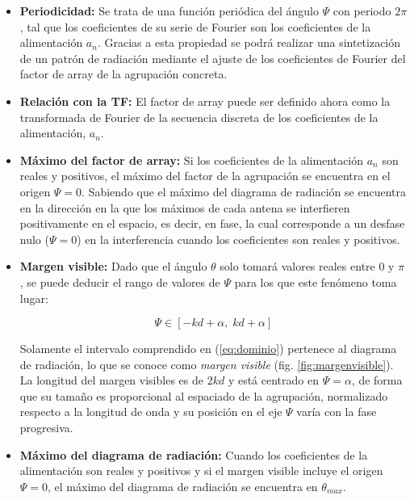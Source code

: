 \begin{itemize}
\item \textbf{Periodicidad: }Se trata de una función periódica del ángulo $\Psi$ con periodo $2\pi$, tal que los coeficientes de su serie de Fourier son los coeficientes de la alimentación $a_{n}$. Gracias a esta propiedad se podrá realizar una sintetización de un patrón de radiación mediante el ajuste de los coeficientes de Fourier del factor de array de la agrupación concreta.

\item \textbf{Relación con la TF: }El factor de array puede ser definido ahora como la transformada de Fourier de la secuencia discreta de los coeficientes de la alimentación, $a_{n}$.

\item \textbf{Máximo del factor de array: }Si los coeficientes de la alimentación $a_{n}$ son reales y positivos, el máximo del factor de la agrupación se encuentra en el origen $\Psi=0$. Sabiendo que el máximo del diagrama de radiación se encuentra en la dirección en la que los máximos de cada antena se interfieren positivamente en el espacio, es decir, en fase, la cual corresponde a un desfase nulo ($\Psi=0$) en la interferencia cuando los coeficientes son reales y positivos.

\item \textbf{Margen visible: }Dado que el ángulo $\theta$ solo tomará valores reales entre 0 y $\pi$, se puede deducir el rango de valores de $\Psi$ para los que este fenómeno toma lugar:

\begin{equation}
	\Psi \in \left [ -kd+\alpha ,\; kd+\alpha \right ]
	\label{eq:dominio}
\end{equation}

\par Solamente el intervalo comprendido en (\ref{eq:dominio}) pertenece al diagrama de radiación, lo que se conoce como \textit{margen visible} (fig. \ref{fig:margenvisible}). La longitud del margen visibles es de $2kd$ y está centrado en $\Psi=\alpha$, de forma que su tamaño es proporcional al espaciado de la agrupación, normalizado respecto a la longitud de onda y su posición en el eje $\Psi$ varía con la fase progresiva.

\item \textbf{Máximo del diagrama de radiación: }Cuando los coeficientes de la alimentación son reales y positivos y si el margen visible incluye el origen $\Psi=0$, el máximo del diagrama de radiación se encuentra en $\theta_{max}$. 


\end{itemize}

